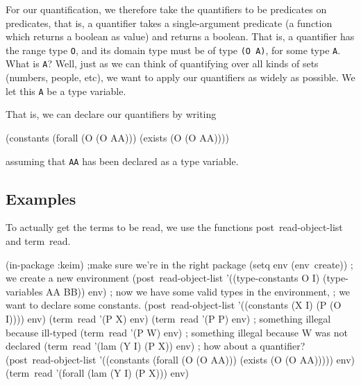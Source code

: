 For our quantification, we therefore 
take the quantifiers to be predicates on predicates, that is, a quantifier
takes a single-argument predicate (a function which returns a boolean as
value) and returns a boolean.  That is, a quantifier has the range type 
{\tt O}, and its domain type must be of type {\tt (O A)}, for some type
{\tt A}.  What is {\tt A}?  Well, just as we can think of quantifying
over all kinds of sets (numbers, people, etc), we want to apply our
quantifiers as widely as possible.  We let this {\tt A} be a type variable.

That is, we can declare our quantifiers by writing
\begin{code}
(constants (forall (O (O AA))) (exists (O (O AA))))
\end{code}
assuming that {\tt AA} has been declared as a type variable.

\subsection{Examples}

To actually get the terms to be read, we use the functions 
{\vb post~read-object-list} and {\vb term~read}.

\begin{code}
\small
(in-package :keim) ;make sure we're in the right package
(setq env (env~create)) ; we create a new environment
(post~read-object-list '((type-constants O I) (type-variables AA BB)) env)
; now we have some valid types in the environment,
; we want to declare some constants.
(post~read-object-list '((constants (X I) (P (O I)))) env)
(term~read '(P X) env) 
(term~read '(P P) env)  ; something illegal because ill-typed
(term~read '(P W) env)  ; something illegal because W was not declared
(term~read '(lam (Y I) (P X)) env)
; how about a quantifier?
(post~read-object-list '((constants (forall (O (O AA))) 
                                    (exists (O (O AA))))) env)	
(term~read '(forall (lam (Y I) (P X))) env)

\end{code}




